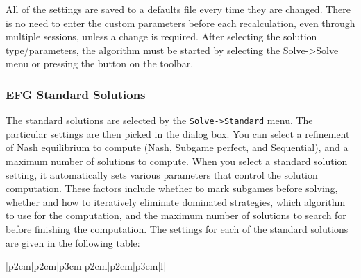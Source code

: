 {All of
the settings are saved to a defaults file every time they are changed. There
is no need to enter the custom parameters before each recalculation, even
through multiple sessions, unless a change is required.
After selecting the solution type/parameters, the algorithm must be started
by selecting the Solve->Solve menu or pressing the button on the toolbar.

\subsubsection{EFG Standard Solutions}\label{EFGStandardSolutions}
The standard solutions are selected by the {\tt Solve->Standard} menu.  The
particular settings are then picked in the dialog box.  You can select a 
refinement of Nash equilibrium to compute (Nash, Subgame perfect, and Sequential), 
and a maximum number of solutions to 
compute.  When you select a standard solution setting, it automatically sets various 
parameters that control the solution computation.  These factors include whether to mark 
subgames before solving, whether and how to iteratively eliminate dominated strategies, 
which algorithm to use for the computation, and the maximum number of solutions to search for 
before finishing the computation.  The settings for each of the standard solutions are 
given in the following table:

\begin{tabular}{|p{2cm}|p{2cm}|p{3cm}|p{2cm}|p{2cm}|p{3cm}|l|}
\hline
{}
\hline
{}
\hline
{}
\hline
{}
\hline
{}
\hline
{}
\hline
{}
\hline
{}
\hline
{}
\hline
\end{tabular}

}
